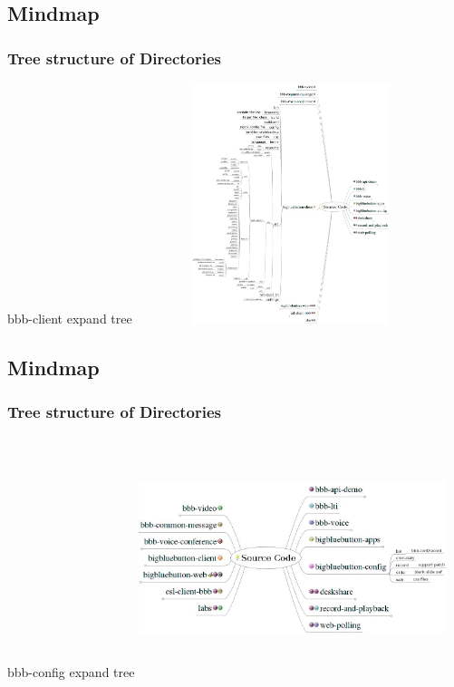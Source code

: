 \documentclass{beamer}
\begin{document}
\subsection*{Mindmap}
\begin{frame}
\frametitle{Tree structure of Directories}
{bbb-client expand tree}
\includegraphics[height=70mm,width=90mm]{./images/SourceCode8.jpeg}
\end{frame}


\subsection*{Mindmap}
\begin{frame}
\frametitle{Tree structure of Directories}
{bbb-config expand tree}
\includegraphics[height=70mm,width=90mm]{./images/SourceCode9.jpeg}
\end{frame}
\end{document}
